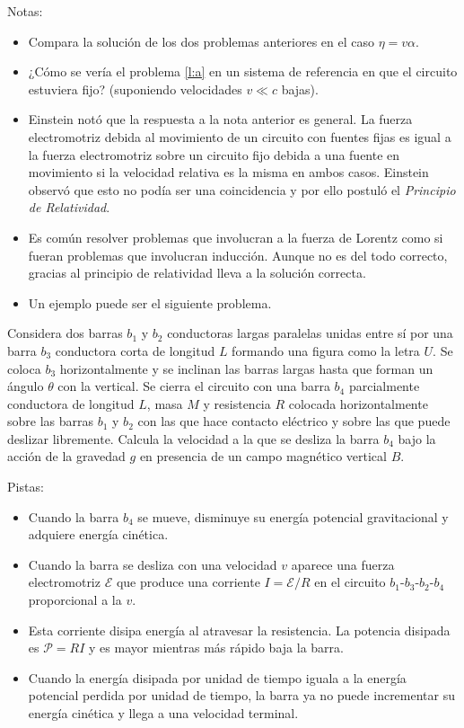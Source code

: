 \documentclass{exam}
\begin{document}
\begin{questions}
  Notas:
  \begin{itemize}
  \item Compara la solución de los dos problemas anteriores en el caso
    $\eta=v\alpha$.
  \item ¿Cómo se vería el problema \ref{l:a} en un sistema de
    referencia en que el circuito estuviera fijo? (suponiendo
    velocidades $v\ll c$ bajas).
  \item Einstein notó que la respuesta a la nota anterior es general. La fuerza
    electromotriz debida al movimiento de un circuito con fuentes
    fijas es igual a la fuerza electromotriz sobre un circuito fijo
    debida a una fuente en movimiento si la velocidad relativa es la
    misma en ambos casos. Einstein observó que esto no
    podía ser una coincidencia y por ello postuló el {\em Principio de
      Relatividad}.
  \item Es común resolver problemas que involucran a la fuerza de
    Lorentz como si fueran problemas que involucran inducción. Aunque
    no es del todo correcto, gracias al principio de
    relatividad lleva a la solución correcta.
  \item Un ejemplo puede ser el siguiente problema.
  \end{itemize}

  \question Considera dos barras $b_1$ y $b_2$ conductoras largas paralelas
  unidas entre sí por una barra $b_3$ conductora corta de longitud $L$
  formando una figura como la letra $U$. Se coloca $b_3$
  horizontalmente y se inclinan las barras largas hasta que forman un
  ángulo $\theta$ con la vertical. Se cierra el circuito
  con una barra $b_4$ parcialmente conductora de longitud $L$, masa $M$ y
  resistencia $R$ colocada horizontalmente sobre las barras $b_1$ y
  $b_2$ con las que hace contacto eléctrico y sobre las que puede deslizar
  libremente. Calcula la velocidad a la que se desliza la barra $b_4$
  bajo la acción de la gravedad $g$ en presencia de un campo magnético
  vertical $B$.

  Pistas:
  \begin{itemize}
  \item Cuando la barra $b_4$ se mueve, disminuye su energía potencial
    gravitacional y adquiere energía cinética.
  \item Cuando la barra se desliza con una velocidad $v$ aparece una fuerza electromotriz
    $\mathcal E$ que produce una corriente $I=\mathcal E/R$ en el
    circuito $b_1$-$b_3$-$b_2$-$b_4$ proporcional a la $v$.
  \item  Esta corriente disipa energía al atravesar la resistencia. La
    potencia disipada es $\mathcal P=RI$ y es mayor mientras más
    rápido baja la barra.
  \item Cuando la energía disipada por unidad de tiempo iguala a la
    energía potencial perdida por unidad de tiempo, la barra ya no
    puede incrementar su energía cinética y llega a una velocidad
    terminal.
  \end{itemize}


\end{questions}
\end{document}
